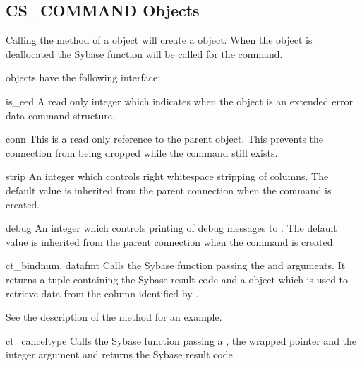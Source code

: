 \subsection{CS_COMMAND Objects}

Calling the  method of a 
object will create a  object.  When the
 object is deallocated the Sybase
 function will be called for the command.

 objects have the following interface:

\begin{memberdesc}[CS_COMMAND]{is_eed}
A read only integer which indicates when the  object
is an extended error data command structure.
\end{memberdesc}

\begin{memberdesc}[CS_COMMAND]{conn}
This is a read only reference to the parent 
object.  This prevents the connection from being dropped while the
command still exists.
\end{memberdesc}

\begin{memberdesc}[CS_COMMAND]{strip}
An integer which controls right whitespace stripping of 
columns.  The default value is inherited from the parent connection
when the command is created.
\end{memberdesc}

\begin{memberdesc}[CS_COMMAND]{debug}
An integer which controls printing of debug messages to .
The default value is inherited from the parent connection when the
command is created.
\end{memberdesc}

\begin{methoddesc}[CS_COMMAND]{ct_bind}{num, datafmt}
Calls the Sybase  function passing the 
and  arguments.  It returns a tuple containing the Sybase
result code and a  object which is used to retrieve data
from the column identified by .

See the description of the  method for an
example.
\end{methoddesc}

\begin{methoddesc}[CS_COMMAND]{ct_cancel}{type}
Calls the Sybase  function passing a 
, the wrapped  pointer and the
integer  argument and returns the Sybase result code.
\end{methoddesc}

